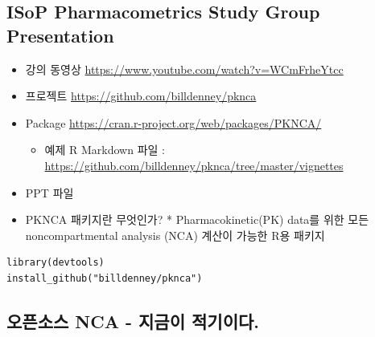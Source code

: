 \documentclass[12pt,]{krantz}
\providecommand{\tightlist}{%
  \setlength{\itemsep}{0pt}\setlength{\parskip}{0pt}}
\begin{document}
\hypertarget{isop-pharmacometrics-study-group-presentation}{%
\subsection{ISoP Pharmacometrics Study Group Presentation}\label{isop-pharmacometrics-study-group-presentation}}

\begin{itemize}
\tightlist
\item
  강의 동영상 \url{https://www.youtube.com/watch?v=WCmFrheYtcc}
\item
  프로젝트 \url{https://github.com/billdenney/pknca}
\item
  Package \url{https://cran.r-project.org/web/packages/PKNCA/}

  \begin{itemize}
  \tightlist
  \item
    예제 R Markdown 파일 : \url{https://github.com/billdenney/pknca/tree/master/vignettes}
  \end{itemize}
\item
  PPT 파일
\item
  PKNCA 패키지란 무엇인가? * Pharmacokinetic(PK) data를 위한 모든 noncompartmental analysis (NCA) 계산이 가능한 R용 패키지
\end{itemize}

\begin{verbatim}
library(devtools)
install_github("billdenney/pknca")
\end{verbatim}

\hypertarget{opennca}{%
\subsection{오픈소스 NCA - 지금이 적기이다.}\label{opennca}}
\end{document}
